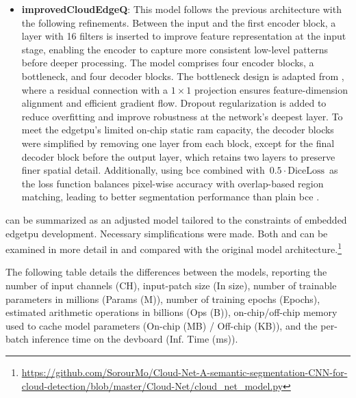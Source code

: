{\begin{itemize}[itemsep=0.5\baselineskip]
    \item \textbf{improvedCloudEdgeQ}: This model follows the previous architecture with the following refinements.
    Between the input and the first encoder block, a  layer with 16 filters is inserted to improve feature representation at the input stage,
    enabling the encoder to capture more consistent low-level patterns before deeper processing.
    The model comprises four encoder blocks, a bottleneck, and four decoder blocks.
    The bottleneck design is adapted from , where a residual connection with a \(1\times1\) projection ensures feature-dimension alignment and efficient gradient flow.
    Dropout regularization is added to reduce overfitting and improve robustness at the network's deepest layer.
    To meet the \gls{edgetpu}'s limited on-chip static \gls{ram} capacity, the decoder blocks were simplified by removing one  layer from each block,
    except for the final decoder block before the output layer, which retains two  layers to preserve finer spatial detail.
    Additionally, using \gls{bce} combined with \(\,0.5 \cdot \text{DiceLoss}\,\) as the loss function balances pixel-wise accuracy with overlap-based region matching,
    leading to better segmentation performance than plain \gls{bce} \cite{bcedice1, bcedice2}.
\end{itemize}

 can be summarized as an adjusted  model tailored to the constraints of embedded \gls{edgetpu} development.
Necessary simplifications were made.
Both  and  can be examined in more detail in  and compared with the original  model
architecture.\footnote{\url{https://github.com/SorourMo/Cloud-Net-A-semantic-segmentation-CNN-for-cloud-detection/blob/master/Cloud-Net/cloud_net_model.py}}

The following table details the differences between the models, reporting the number of input channels (CH),
input-patch size (In size), number of trainable parameters in millions (Params (M)), number of training epochs (Epochs),
estimated arithmetic operations in billions (Ops (B)), on-chip/off-chip memory used to cache model parameters (On-chip (MB) / Off-chip (KB)),
and the per-batch inference time on the \gls{devboard} (Inf. Time (ms)).

}
